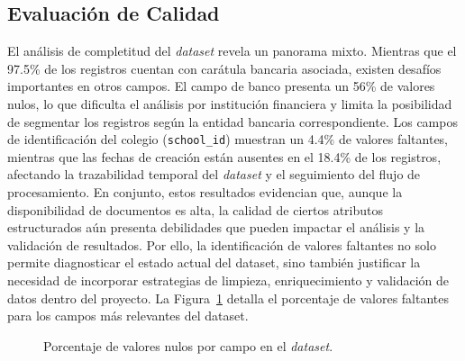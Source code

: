 \subsection{Evaluación de Calidad}

El análisis de completitud del \textit{dataset} revela un panorama mixto. Mientras que el 97.5\% de los registros cuentan con carátula bancaria asociada, existen desafíos importantes en otros campos. El campo de banco presenta un 56\% de valores nulos, lo que dificulta el análisis por institución financiera y limita la posibilidad de segmentar los registros según la entidad bancaria correspondiente. Los campos de identificación del colegio (\texttt{school\_id}) muestran un 4.4\% de valores faltantes, mientras que las fechas de creación están ausentes en el 18.4\% de los registros, afectando la trazabilidad temporal del \textit{dataset} y el seguimiento del flujo de procesamiento. En conjunto, estos resultados evidencian que, aunque la disponibilidad de documentos es alta, la calidad de ciertos atributos estructurados aún presenta debilidades que pueden impactar el análisis y la validación de resultados. Por ello, la identificación de valores faltantes no solo permite diagnosticar el estado actual del dataset, sino también justificar la necesidad de incorporar estrategias de limpieza, enriquecimiento y validación de datos dentro del proyecto. La Figura~\ref{fig:porcentaje_nulos} detalla el porcentaje de valores faltantes para los campos más relevantes del dataset.


\begin{figure}[htbp]
\centering
{}
\caption{Porcentaje de valores nulos por campo en el \textit{dataset}.}
\label{fig:porcentaje_nulos}
\end{figure}


